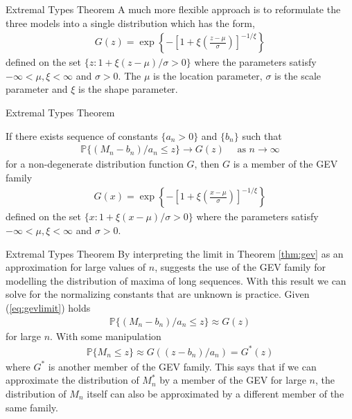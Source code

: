 \documentclass[10pt]{beamer}
\begin{document}
\begin{frame}{Extremal Types Theorem}
A much more flexible approach is to reformulate the three models into a single distribution which has the form,
\begin{align}\label{eq:gev}
G(z) = \exp \left\{-\left[1+\xi\left(\frac{z-\mu}{\sigma}\right)\right]^{-1/\xi}\right\}
\end{align}
defined on the set $\{z : 1 + \xi(z-\mu)/\sigma>0\}$ where the parameters satisfy $-\infty<\mu, \xi<\infty$ and $\sigma >0$. The $\mu$ is the location parameter, $\sigma$ is the scale parameter and $\xi$ is the shape parameter.

\end{frame}

\begin{frame}{Extremal Types Theorem}
\begin{theorem}\label{thm:gev}
If there exists sequence of constants $\{a_n>0\}$ and $\{b_n\}$ such that 
\begin{align}\label{eq:gevlimit}
\mathbb{P}\{(M_n - b_n)/a_n\leq z\} \to G(z) \quad\text{ as } n \to \infty
\end{align}
for a non-degenerate distribution function $G$, then $G$ is a member of the GEV family
\begin{align}
G(x) = \exp \left\{-\left[1+\xi\left(\frac{x-\mu}{\sigma}\right)\right]^{-1/\xi}\right\}
\end{align}
defined on the set $\{x : 1 + \xi(x-\mu)/\sigma>0\}$ where the parameters satisfy $-\infty<\mu, \xi<\infty$ and $\sigma >0$.
\end{theorem}
\end{frame}

\begin{frame}{Extremal Types Theorem}
By interpreting the limit in Theorem \ref{thm:gev} as an approximation for large values of $n$, suggests the use of the GEV family for modelling the distribution of maxima of long sequences. With this result we can solve for the normalizing constants that are unknown is practice. Given (\ref{eq:gevlimit}) holds
\begin{align*}
\mathbb{P}\{(M_n-b_n)/a_n\leq z\} \approx G(z)
\end{align*}
for large $n$. With some manipulation 
\begin{align*}
\mathbb{P}\{M_n\leq z\} \approx G((z-b_n)/a_n) = G^\ast(z)
\end{align*}
where $G^\ast$ is another member of the GEV family. This says that if we can approximate the distribution of $M_n^\ast$ by a member of the GEV for large $n$, the distribution of $M_n$ itself can also be approximated by a different member of the same family.
\end{frame}
\end{document}
